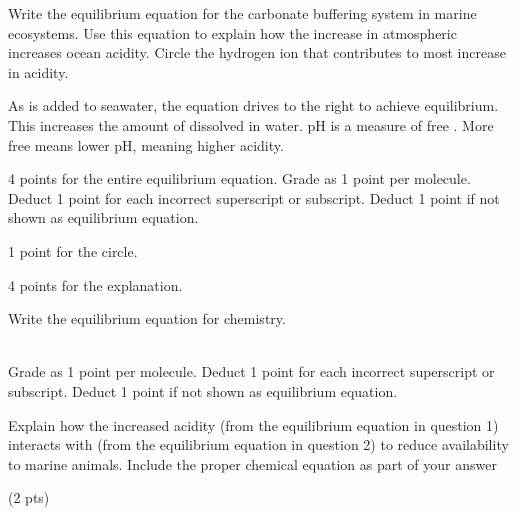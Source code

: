 \documentclass[11pt, addpoints]{exam}
\newcommand*\AnswerBox[2]{%
    \parbox[t][#1]{0.92\textwidth}{%
    \begin{solution}#2\end{solution}}
    \vspace*{\stretch{1}}
}
\newenvironment{AnswerPage}[1]
    {\begin{minipage}[t][#1]{0.92\textwidth}%
    \begin{solution}}
    {\end{solution}\end{minipage}
    \vspace*{\stretch{1}}}
\newlength{\basespace}
\begin{document}
\begin{questions}


\question[10]
Write the equilibrium equation for the carbonate buffering system in
marine ecosystems. Use this equation to explain how the increase in
atmospheric  increases ocean acidity. Circle the hydrogen ion 
that contributes to most increase in acidity.

\begin{AnswerPage}{6\basespace}%


\vspace{\baselineskip}

As  is added to seawater, the equation drives to the right to achieve equilibrium. This increases the amount of  dissolved in water. pH is a measure of free .  More free  means lower pH, meaning higher acidity.

\vspace{\baselineskip}

4 points for the entire equilibrium equation. Grade as 1 point per molecule. Deduct 1 point for each incorrect superscript or subscript. Deduct 1 point if not shown as equilibrium equation.

1 point for the circle. 

4 points for the explanation.

\end{AnswerPage}

\question[5]
Write the equilibrium equation for  chemistry.

\AnswerBox{1\basespace}{%
   \\
Grade as 1 point per molecule. Deduct 1 point for each incorrect superscript or subscript. Deduct 1 point if not shown as equilibrium equation.
}
\newpage

\question[10]
Explain how the increased acidity (from the equilibrium equation in
question 1) interacts with  (from the equilibrium equation in question 2)
to reduce  availability to marine animals. Include
the proper chemical equation as part of your answer 

\begin{AnswerPage}{6\basespace}%

 \qquad (2 pts)


\end{AnswerPage}
\end{questions}
\end{document}
